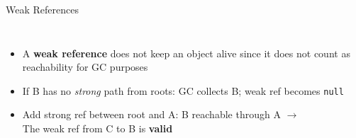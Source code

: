 \documentclass[aspectratio=169]{beamer}
\begin{document}
\begin{frame}{Weak References}
\begin{columns}[T]
        \small
        \begin{itemize}
            \item<1-> A \textbf{weak reference} does not keep an object alive since it does not count as reachability for GC purposes
            \item<2-> If B has no \emph{strong} path from roots: GC collects B; weak ref becomes \texttt{null}
            \item<3-> Add strong ref between root and A: B reachable through A $\to$\\
                      The weak ref from C to B is \textbf{valid}
        \end{itemize}
    \end{columns}
\end{frame}
\end{document}
